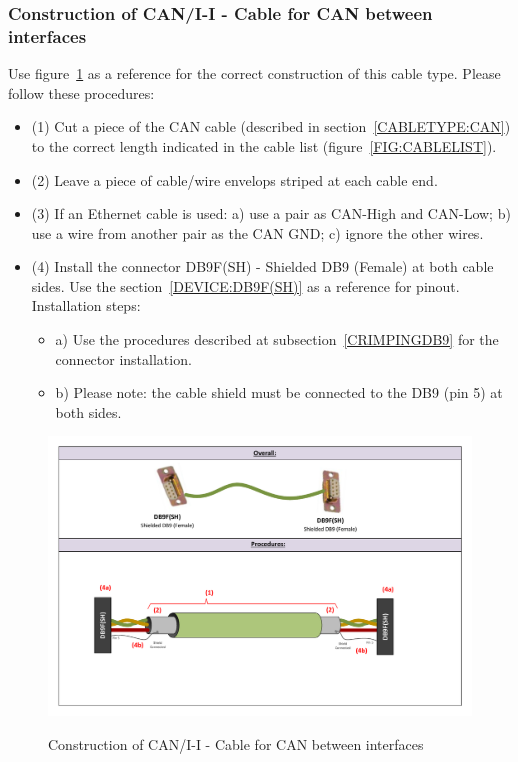 \subsubsection{Construction of CAN/I-I - Cable for CAN between interfaces} \label{CONSTRUCTION:CANII}
Use figure~\ref{FIG:CANIIconstruction} as a reference for the correct construction of this cable type. Please follow these procedures:
\begin{itemize}
  \item (1) Cut a piece of the CAN cable (described in section~\ref{CABLETYPE:CAN}) to the correct length indicated in the cable list (figure~\ref{FIG:CABLELIST}).
  \item (2) Leave a piece of cable/wire envelops striped at each cable end.
  \item (3) If an Ethernet cable is used: a) use a pair as CAN-High and CAN-Low; b) use a wire from another pair as the CAN GND; c) ignore the other wires.
  \item (4) Install the connector DB9F(SH) - Shielded DB9 (Female) at both cable sides. Use the section~\ref{DEVICE:DB9F(SH)} as a reference for pinout. Installation steps:
  \begin{itemize}
    \item a) Use the procedures described at subsection~\ref{CRIMPINGDB9} for the connector installation.
    \item b) Please note: the cable shield must be connected to the DB9 (pin 5) at both sides.
  \end{itemize} 
\end{itemize}
\begin{figure}
  \centering
  \includegraphics[angle=90,width=1\columnwidth]{figs/body03/FIGCANIIconstruction.pdf}\\
  \caption[Construction of CAN/I-I - Cable for CAN between interfaces]{Construction of CAN/I-I - Cable for CAN between interfaces}
  \label{FIG:CANIIconstruction}
\end{figure}

